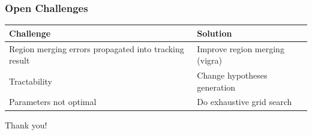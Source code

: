 \begin{frame}[shrink=25]
\begin{figure}
    \end{figure}
\end{frame}

\begin{frame}
    \frametitle{Open Challenges}
    \renewcommand{\arraystretch}{1.5}
    \begin{tabularx}{\textwidth}{X|X}
        Challenge & Solution \\ \hline
        Region merging errors propagated into tracking result  & Improve region merging (vigra) \\
        Tractability & Change hypotheses generation \\
        Parameters not optimal & Do exhaustive grid search \\
    \end{tabularx}
\end{frame}

\begin{frame}
    \begin{center}
        Thank you!
    \end{center}
\end{frame}



